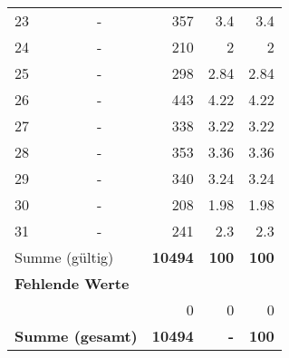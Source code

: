 \begin{longtable}{lXrrr}
        23 & \multicolumn{1}{X}{-} & %
          \num{357} &
          \num[round-mode=places,round-precision=2]{3.4} &
          \num[round-mode=places,round-precision=2]{3.4} \\

        24 & \multicolumn{1}{X}{-} & %
          \num{210} &
          \num[round-mode=places,round-precision=2]{2} &
          \num[round-mode=places,round-precision=2]{2} \\

        25 & \multicolumn{1}{X}{-} & %
          \num{298} &
          \num[round-mode=places,round-precision=2]{2.84} &
          \num[round-mode=places,round-precision=2]{2.84} \\

        26 & \multicolumn{1}{X}{-} & %
          \num{443} &
          \num[round-mode=places,round-precision=2]{4.22} &
          \num[round-mode=places,round-precision=2]{4.22} \\

        27 & \multicolumn{1}{X}{-} & %
          \num{338} &
          \num[round-mode=places,round-precision=2]{3.22} &
          \num[round-mode=places,round-precision=2]{3.22} \\

        28 & \multicolumn{1}{X}{-} & %
          \num{353} &
          \num[round-mode=places,round-precision=2]{3.36} &
          \num[round-mode=places,round-precision=2]{3.36} \\

        29 & \multicolumn{1}{X}{-} & %
          \num{340} &
          \num[round-mode=places,round-precision=2]{3.24} &
          \num[round-mode=places,round-precision=2]{3.24} \\

        30 & \multicolumn{1}{X}{-} & %
          \num{208} &
          \num[round-mode=places,round-precision=2]{1.98} &
          \num[round-mode=places,round-precision=2]{1.98} \\

        31 & \multicolumn{1}{X}{-} & %
          \num{241} &
          \num[round-mode=places,round-precision=2]{2.3} &
          \num[round-mode=places,round-precision=2]{2.3} \\

     \midrule
     \multicolumn{2}{l}{Summe (gültig)} &
       \textbf{\num{10494}} &
     \textbf{\num{100}} &
       \textbf{\num[round-mode=places,round-precision=2]{100}} \\
     \multicolumn{5}{l}{\textbf{Fehlende Werte}}\\
      & & 0 & 0 & 0 \\
     \midrule
     \multicolumn{2}{l}{\textbf{Summe (gesamt)}} &
          \textbf{\num{10494}} &
        \textbf{-} &
        \textbf{\num{100}} \\
     \bottomrule
     \end{longtable}
     
